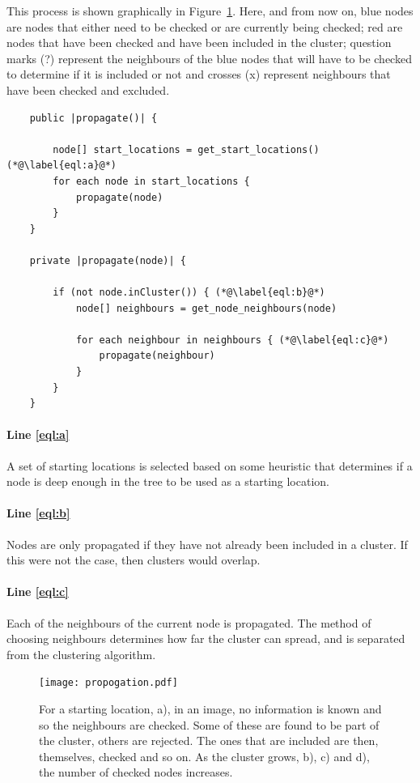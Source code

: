 This process is shown graphically in Figure~\ref{fig:propogation}. Here, and
from now on, blue nodes are nodes that either need to be checked or are
currently being checked; red are nodes that have been checked and have been
included in the cluster; question marks ({\footnotesize?}) represent the
neighbours of the blue nodes that will have to be checked to determine if it is
included or not and crosses ({\footnotesize x}) represent neighbours that have
been checked and excluded.

\begin{lstlisting}
	public |propagate()| {

		node[] start_locations = get_start_locations() (*@\label{eql:a}@*)
		for each node in start_locations {
			propagate(node)
		}
	}

	private |propagate(node)| {

		if (not node.inCluster()) { (*@\label{eql:b}@*)
			node[] neighbours = get_node_neighbours(node)

			for each neighbour in neighbours { (*@\label{eql:c}@*)
				propagate(neighbour)
			}
		}
	}
\end{lstlisting}

\paragraph{Line \ref{eql:a}} A set of starting locations is selected based on
some heuristic that determines if a node is deep enough in the tree to be used
as a starting location.

\paragraph{Line \ref{eql:b}} Nodes are only propagated if they have not already
been included in a cluster. If this were not the case, then clusters would
overlap.

\paragraph{Line \ref{eql:c}} Each of the neighbours of the current node is
propagated. The method of choosing neighbours determines how far the cluster
can spread, and is separated from the clustering algorithm.

\begin{figure}[tbhp]
	\centering
	\texttt{[image: propogation.pdf]}
	\caption{For a starting location, a), in an image, no information is known
		and so the neighbours are checked. Some of these are found to be part
		of the cluster, others are rejected. The ones that are included are
		then, themselves, checked and so on. As the cluster grows, b), c) and
		d), the number of checked nodes increases.} \label{fig:propogation}
\end{figure}


